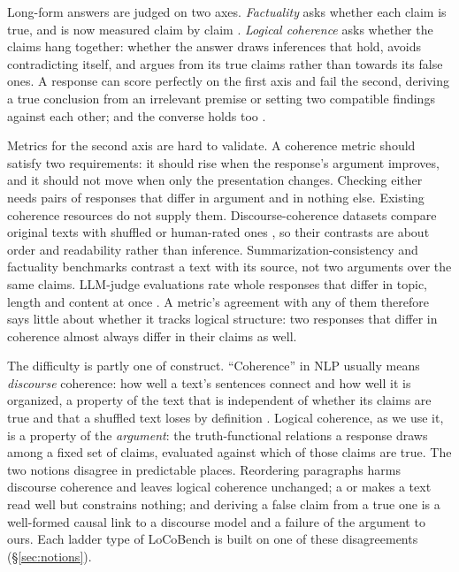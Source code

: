 \documentclass[11pt]{article}
\begin{document}
Long-form answers are judged on two axes. \emph{Factuality} asks whether each claim is true, and
is now measured claim by claim \citep{factscore,safe,veriscore,factreasoner}. \emph{Logical
coherence} asks whether the claims hang together: whether the answer draws inferences that hold,
avoids contradicting itself, and argues from its true claims rather than towards its false ones.
A response can score perfectly on the first axis and fail the second, deriving a true conclusion
from an irrelevant premise or setting two compatible findings against each other; and the
converse holds too \citep{lorefact}.

Metrics for the second axis are hard to validate. A coherence metric should satisfy two
requirements: it should rise when the response's argument improves, and it should not move when
only the presentation changes. Checking either needs pairs of responses that differ in argument
and in nothing else. Existing coherence resources do not supply them. Discourse-coherence
datasets compare original texts with shuffled or human-rated ones \citep{barzilay,gcdc}, so their
contrasts are about order and readability rather than inference. Summarization-consistency and
factuality benchmarks \citep{summac,frank,summeval} contrast a text with its source, not two
arguments over the same claims. LLM-judge evaluations rate whole responses that differ in topic,
length and content at once \citep{geval,zheng2023judge}. A metric's agreement with any of them
therefore says little about whether it tracks logical structure: two responses that differ in
coherence almost always differ in their claims as well.

The difficulty is partly one of construct. ``Coherence'' in NLP usually means \emph{discourse}
coherence: how well a text's sentences connect and how well it is organized, a property of the
text that is independent of whether its claims are true and that a shuffled text loses by
definition \citep{grosz1995,barzilay}. Logical coherence, as we use it, is a property of the
\emph{argument}: the truth-functional relations a response draws among a fixed set of claims,
evaluated against which of those claims are true. The two notions disagree in predictable places.
Reordering paragraphs harms discourse coherence and leaves logical coherence unchanged; a
 or  makes a text read well but constrains nothing; and
deriving a false claim from a true one is a well-formed causal link to a discourse model and a
failure of the argument to ours. Each ladder type of LoCoBench is built on one of these
disagreements (\S\ref{sec:notions}).
\end{document}
